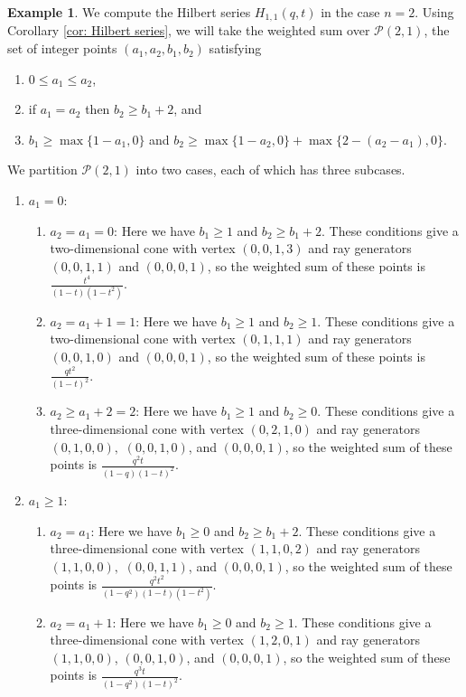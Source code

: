 \documentclass[12pt]{amsart}
\numberwithin{equation}{section}
\theoremstyle{definition}
\newtheorem{example}[theorem]{Example}
\begin{document}
\begin{example}
\label{ex:k=m=1}
    We compute the Hilbert series $H_{1,1}(q,t)$ in the case $n=2$. Using Corollary \ref{cor: Hilbert series}, we will take the weighted sum over $\mathcal{P}(2,1)$, the set of integer points $(a_1,a_2,b_1,b_2)$ satisfying
    \begin{enumerate}
        \item $0\leq a_1\leq a_2$,
        \item if $a_1 = a_2$ then $b_2\geq b_1+2$, and 
        \item $b_1\geq \max\{1-a_1,0\}$ and $b_2\geq \max\{ 1-a_2,0 \}+\max\{2-(a_2-a_1),0\}$.
    \end{enumerate}
    We partition $\mathcal{P}(2,1)$ into two cases, each of which has three subcases.
    \begin{enumerate}
        \item $a_1=0$:
        \begin{enumerate}
            \item $a_2=a_1=0$: Here we have $b_1\geq 1$ and $b_2\geq b_1+2$. These conditions give a two-dimensional cone with vertex $(0,0,1,3)$ and ray generators $(0,0,1,1)$ and $(0,0,0,1)$, so the weighted sum of these points is $ \frac{t^4}{(1-t)(1-t^2)}$.
            \item $a_2=a_1+1=1$: Here we have $b_1\geq 1$ and $b_2\geq 1$. These conditions give a two-dimensional cone with vertex $(0,1,1,1)$ and ray generators $(0,0,1,0)$ and $(0,0,0,1)$, so the weighted sum of these points is $\frac{qt^2}{(1-t)^2}$.
            \item $a_2\geq a_1 +2=2$: Here we have $b_1\geq 1$ and $b_2\geq 0$. These conditions give a three-dimensional cone with vertex $(0,2,1,0)$ and ray generators $(0,1,0,0),$ $(0,0,1,0)$, and $(0,0,0,1)$, so the weighted sum of these points is $\frac{q^2t}{(1-q)(1-t)^2}$.
        \end{enumerate}
        \item $a_1\geq 1$:
        \begin{enumerate}
            \item $a_2= a_1$: Here we have $b_1\geq 0$ and $b_2\geq b_1+2$. These conditions give a three-dimensional cone with vertex $(1,1,0,2)$ and ray generators $(1,1,0,0),$ $(0,0,1,1)$, and $(0,0,0,1)$, so the weighted sum of these points is $\frac{q^2t^2}{(1-q^2)(1-t)(1-t^2)}$.
            \item $a_2=a_1+1$: Here we have $b_1\geq 0$ and $b_2\geq 1$. These conditions give a three-dimensional cone with vertex $(1,2,0,1)$ and ray generators $(1,1,0,0)$, $(0,0,1,0)$, and $(0,0,0,1)$, so the weighted sum of these points is $\frac{q^3t}{(1-q^2)(1-t)^2}$.

\end{enumerate}
\end{enumerate}
\end{example}
\end{document}
